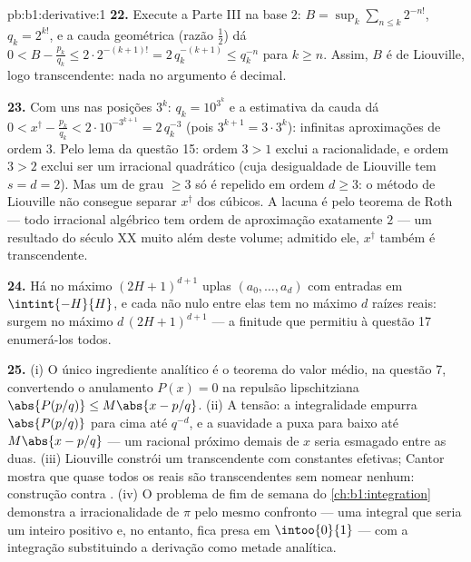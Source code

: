 \begin{solution}{pb:b1:derivative:1}
\textbf{22.} Execute a Parte III na base $2$: $B = \sup_k \sum_{n\leq
k} 2^{-n!}$, $q_k = 2^{k!}$, e a cauda geométrica (razão
$\frac12$) dá $0 < B - \frac{p_k}{q_k} \leq 2\cdot2^{-(k+1)!}
= 2\,q_k^{-(k+1)} \leq q_k^{-n}$ para $k \geq n$. Assim, $B$ é
de Liouville, logo transcendente: nada no argumento é
decimal.

\textbf{23.} Com uns nas posições $3^k$: $q_k = 10^{3^k}$ e
a estimativa da cauda dá $0 < x^\dagger - \frac{p_k}{q_k} <
2\cdot10^{-3^{k+1}} = 2\,q_k^{-3}$ (pois $3^{k+1} = 3\cdot3^k$):
infinitas aproximações de ordem $3$. Pelo lema da
questão 15: ordem $3 > 1$ exclui a racionalidade, e ordem $3 >
2$ exclui ser um irracional quadrático (cuja desigualdade de Liouville
tem $s = d = 2$). Mas um  de grau
$\geq 3$ só é repelido em ordem $d \geq 3$: o método de Liouville
não consegue separar $x^\dagger$ dos cúbicos. A lacuna é
 pelo teorema de Roth --- todo irracional algébrico tem
ordem de aproximação exatamente $2$ --- um resultado do século XX
muito além deste volume; admitido ele, $x^\dagger$ também é
transcendente.

\textbf{24.} Há no máximo $(2H+1)^{d+1}$ uplas $(a_0,
\dots, a_d)$ com entradas em $\intint{-H}{H}$, e cada  não nulo
entre elas tem no máximo $d$ raízes reais: surgem no máximo
$d\,(2H+1)^{d+1}$  --- a finitude
que permitiu à questão 17 enumerá-los todos.

\textbf{25.} (i) O único ingrediente analítico é o teorema do
valor médio, na questão 7, convertendo o anulamento $P(x) =
0$ na repulsão lipschitziana $\abs{P(p/q)} \leq M\abs{x -
p/q}$. (ii) A tensão: a integralidade empurra $\abs{P(p/q)}$ para
cima até $q^{-d}$, e a suavidade a puxa para baixo até $M\abs{x - p/q}$ --- um racional próximo demais de $x$ seria esmagado entre as
duas. (iii) Liouville constrói um transcendente com constantes
efetivas; Cantor mostra que quase todos os reais são transcendentes
sem nomear nenhum: construção contra . (iv) O
problema de fim de semana do \cref{ch:b1:integration} demonstra a
irracionalidade de $\pi$ pelo mesmo confronto --- uma integral que
seria um inteiro positivo e, no entanto, fica presa em $\intoo{0}{1}$ ---
com a integração substituindo a derivação como metade
analítica.
\end{solution}
